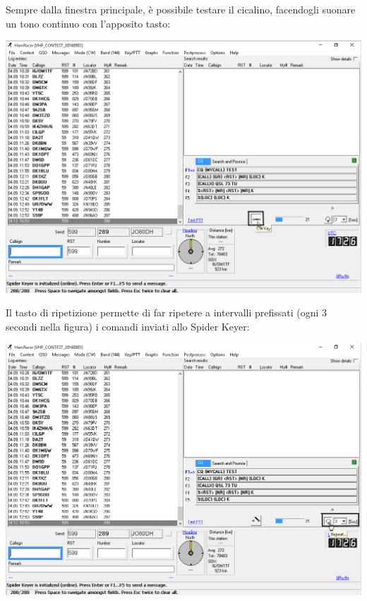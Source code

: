 \begin{samepage}
	Sempre dalla finestra principale, \`e possibile testare il cicalino, facendogli suonare un tono continuo con l'apposito tasto:
\begin{center}
	\includegraphics[width=\linewidth]{./config02.png}
\end{center}
\end{samepage}
\pagebreak
\begin{samepage}
	Il tasto di ripetizione permette di far ripetere a intervalli prefissati (ogni 3 secondi nella figura) i comandi inviati allo Spider Keyer:
	\begin{center}
	\includegraphics[width=\linewidth]{./config03.png}
\end{center}
\end{samepage}
